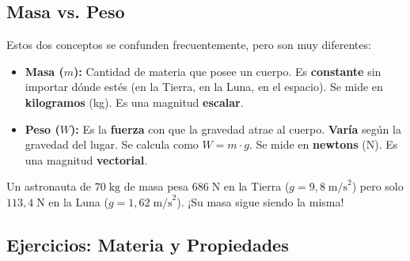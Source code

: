 \documentclass[12pt, letterpaper]{article}
\begin{document}
\subsection{Masa vs. Peso}

Estos dos conceptos se confunden frecuentemente, pero son muy diferentes:

\begin{cuadroteoria}
  \begin{itemize}[leftmargin=*]
    \item \textbf{Masa ($m$):} Cantidad de materia que posee un cuerpo. Es \textbf{constante} sin importar dónde estés (en la Tierra, en la Luna, en el espacio). Se mide en \textbf{kilogramos} (kg). Es una magnitud \textbf{escalar}.

    \item \textbf{Peso ($W$):} Es la \textbf{fuerza} con que la gravedad atrae al cuerpo. \textbf{Varía} según la gravedad del lugar. Se calcula como $W = m \cdot g$. Se mide en \textbf{newtons} (N). Es una magnitud \textbf{vectorial}.
  \end{itemize}
\end{cuadroteoria}

Un astronauta de $70\;\text{kg}$ de masa pesa $686\;\text{N}$ en la Tierra ($g = 9{,}8\;\text{m/s}^2$) pero solo $113{,}4\;\text{N}$ en la Luna ($g = 1{,}62\;\text{m/s}^2$). ¡Su masa sigue siendo la misma!


\subsection{Ejercicios: Materia y Propiedades}
\end{document}
